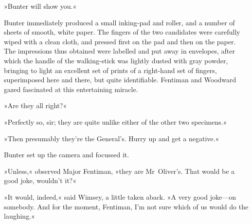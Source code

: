 »Bunter will show you.«

Bunter immediately produced a small inking-pad and roller, and a number of sheets of smooth, white paper. The fingers of the two candidates were carefully wiped with a clean cloth, and pressed first on the pad and then on the paper. The impressions thus obtained were labelled and put away in envelopes, after which the handle of the walking-stick was lightly dusted with gray powder, bringing to light an excellent set of prints of a right-hand set of fingers, superimposed here and there, but quite identifiable. Fentiman and Woodward gazed fascinated at this entertaining miracle.

»Are they all right?«

»Perfectly so, sir; they are quite unlike either of the other two specimens.«

»Then presumably they're the General's. Hurry up and get a negative.«

Bunter set up the camera and focussed it.

»Unless,« observed Major Fentiman, »they are Mr~Oliver's. That would be a good joke, wouldn't it?«

»It would, indeed,« said Wimsey, a little taken aback. »A very good joke—on somebody. And for the moment, Fentiman, I'm not sure which of us would do the laughing.«


